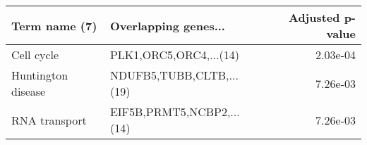 \begin{tabular}{llr}
\toprule
     Term name (7) &      Overlapping genes... &  Adjusted p-value \\
\midrule
        Cell cycle &    PLK1,ORC5,ORC4,...(14) &          2.03e-04 \\
Huntington disease &  NDUFB5,TUBB,CLTB,...(19) &          7.26e-03 \\
     RNA transport & EIF5B,PRMT5,NCBP2,...(14) &          7.26e-03 \\
\bottomrule
\end{tabular}
